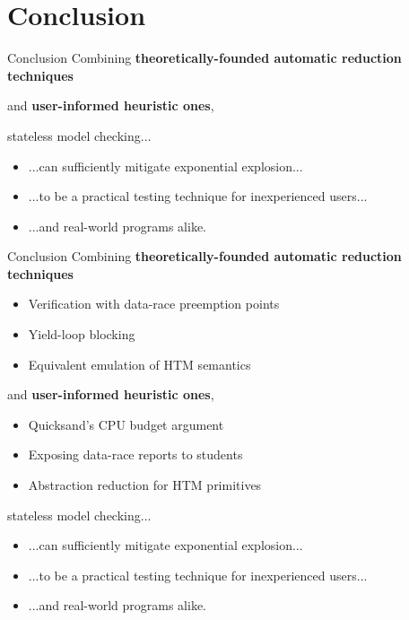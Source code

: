 \documentclass[xcolor=dvipsnames]{beamer}
\newcommand\hilight[2]{\color{#1}#2\color{black}}
\begin{document}

\section{Conclusion}

\begin{frame}{Conclusion}
	Combining %
	{\bf theoretically-founded automatic reduction techniques}
	\vspace{4.82em}

	and {\bf user-informed heuristic ones},
	\vspace{4.82em}

	stateless model checking...
	\begin{itemize}
		\item ...can sufficiently mitigate exponential explosion...
		\item ...to be a practical testing technique for inexperienced users...
		\item ...and real-world programs alike.
	\end{itemize}
\end{frame}
\begin{frame}{Conclusion}
	Combining %
	{\bf theoretically-founded automatic reduction techniques}
	\begin{itemize}
		\item Verification with data-race preemption points
		\item Yield-loop blocking
		\item Equivalent emulation of HTM semantics
	\end{itemize}
	and {\bf user-informed heuristic ones},
	\begin{itemize}
		\item Quicksand's CPU budget argument
		\item Exposing data-race reports to students
		\item Abstraction reduction for HTM primitives
	\end{itemize}
	\hilight{gray}{stateless model checking...}
	\begin{itemize}
		\item \hilight{gray}{...can sufficiently mitigate exponential explosion...}
		\item \hilight{gray}{...to be a practical testing technique for inexperienced users...}
		\item \hilight{gray}{...and real-world programs alike.}
	\end{itemize}
\end{frame}
\end{document}
